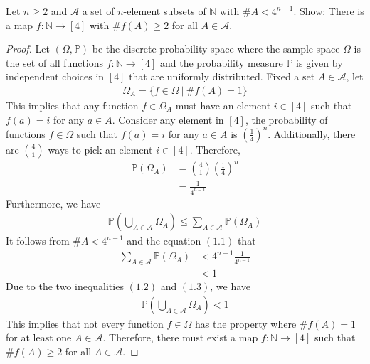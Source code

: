 \begin{problem}
  Let $n \geq 2$ and $\mathcal{A}$ a set of $n$-element subsets of $\mathbb{N}$ with $\#A < 4^{n-1}$. Show: There is a map $f : \mathbb{N} \to [4]$ with $\# f(A) \geq 2$ for all $A \in \mathcal{A}$. 
\end{problem}
\begin{proof}
  Let $(\Omega, \mathbb{P})$ be the discrete probability space where the sample space $\Omega$ is the set of all functions $f : \mathbb{N} \to [4]$ and the probability measure $\mathbb{P}$ is given by independent choices in $[4]$ that are uniformly distributed. Fixed a set $A \in \mathcal{A}$, let
  \begin{align*}
    \Omega_{A} = \{f \in \Omega \ | \ \# f(A)=1\}   
  \end{align*}
  This implies that any function $f \in \Omega_{A}$ must have an element $i \in [4]$ such that $f(a)=i$ for any $a \in A$. Consider any element in $[4]$, the probability of functions $f \in \Omega$ such that $f(a)=i$ for any $a \in A$ is $(\frac{1}{4})^{n}$. Additionally, there are $\binom{4}{1}$ ways to pick an element $i \in [4]$. Therefore,
  \begin{align*}
    \mathbb{P}(\Omega_{A}) &= \binom{4}{1} \left( \frac{1}{4} \right)^{n} \\
                           &= \frac{1}{4^{n-1}} \tag{1.1}
  \end{align*}
  Furthermore, we have
  \begin{align*}
    \mathbb{P}(\bigcup_{A \in \mathcal{A}} \Omega_{A}) \leq \sum_{A \in \mathcal{A}} \mathbb{P}(\Omega_{A}) \tag{1.2}
  \end{align*}
  It follows from $\#A < 4^{n-1}$ and the equation $(1.1)$ that
  \begin{align*}
    \sum_{A \in \mathcal{A}} \mathbb{P}(\Omega_{A}) &< 4^{n-1} \frac{1}{4^{n-1}} \\
                                                    &< 1 \tag{1.3}
  \end{align*}
  Due to the two inequalities $(1.2)$ and $(1.3)$, we have
  \begin{align*}
    \mathbb{P}(\bigcup_{A \in \mathcal{A}} \Omega_{A}) < 1
  \end{align*}
  This implies that not every function $f \in \Omega$ has the property where $\#f(A)=1$ for at least one $A \in \mathcal{A}$. Therefore, there must exist a map $f : \mathbb{N} \to [4]$ such that $\# f(A) \geq 2$ for all $A \in \mathcal{A}$.
\end{proof}

